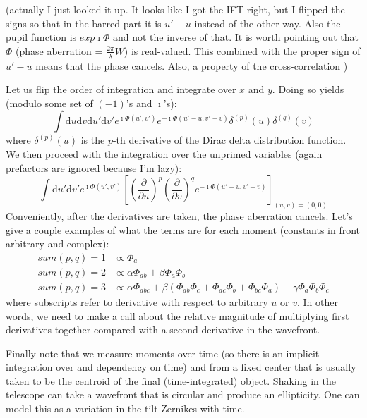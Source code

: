 \documentclass[aas_macros,preprint]{aastex}%
\newcommand{\dd}{\mathrm{d}}
\begin{document}
(actually I just looked it up. It looks like I got the IFT right, but I flipped
the signs so that in the barred part it is $u' - u$ instead of the other way.
Also the pupil function is $exp{\imath \Phi}$ and not the inverse of that. It
is worth pointing out that $\Phi$ (phase aberration = $\frac{2\pi}{\lambda} W$)
is real-valued. This combined with the proper sign of $u' - u$ means that the
phase cancels.  Also, a property of the cross-correlation )


Let us flip the order of integration and integrate over $x$ and $y$. Doing so
yields (modulo some set of $(-1)$'s and $\imath$'s):
\begin{equation}
  \int \dd u \dd v \dd u' \dd v' e^{\imath \Phi(u', v')} e^{-\imath
  \Phi(u' - u, v' - v)} \delta^{(p)}(u) \delta^{(q)}(v)
\end{equation}
where $\delta^{(p)}(u)$ is the $p$-th derivative of the Dirac delta
distribution function. We then proceed with the integration over the unprimed
variables (again prefactors are ignored because I'm lazy):
\begin{equation}
  \int \dd u' \dd v' e^{\imath \Phi(u', v')} \left[
    \left(\frac{\partial}{\partial u} \right)^p \left(\frac{\partial}{\partial
  v} \right)^q e^{-\imath \Phi(u' - u, v' - v)} \right ]_{(u,v) = (0,0)}
\end{equation}
Conveniently, after the derivatives are taken, the phase aberration cancels.
Let's give a couple examples of what the terms are for each moment (constants
in front arbitrary and complex):
\begin{align}
  sum(p,q)=1 &\propto \Phi_a \\
  sum(p,q)=2 &\propto \alpha \Phi_{ab} + \beta \Phi_a \Phi_b \\
  sum(p,q)=3 &\propto \alpha \Phi_{abc} + \beta \left( \Phi_{ab} \Phi_c +
\Phi_{ac} \Phi_b + \Phi_{bc} \Phi_a \right) + \gamma \Phi_a \Phi_b \Phi_c
\end{align}
where subscripts refer to derivative with respect to arbitrary $u$ or $v$. In
other words, we need to make a call about the relative magnitude of multiplying
first derivatives together compared with a second derivative in the wavefront.

Finally note that we measure moments over time (so there is an implicit
integration over and dependency on time) and from a fixed center that is
usually taken to be the centroid of the final (time-integrated) object. Shaking
in the telescope can take a wavefront that is circular and produce an
ellipticity. One can model this as a variation in the tilt Zernikes with time.
\end{document}
